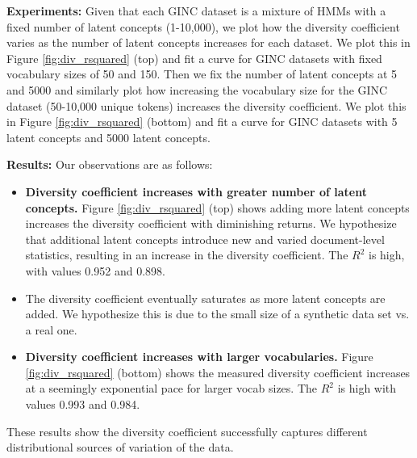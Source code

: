 \documentclass[10pt]{article} %
\begin{document}
\textbf{Experiments:}
Given that each GINC dataset is a mixture of HMMs with a fixed number of latent concepts (1-10,000), we plot how the diversity coefficient varies as the number of latent concepts increases for each dataset.
We plot this in Figure \ref{fig:div_rsquared} (top) and fit a curve for GINC datasets with fixed vocabulary sizes of 50 and 150.
Then we fix the number of latent concepts at 5 and 5000 and similarly plot how increasing the vocabulary size for the GINC dataset (50-10,000 unique tokens) increases the diversity coefficient.
We plot this in Figure \ref{fig:div_rsquared} (bottom) and fit a curve for GINC datasets with 5 latent concepts and 5000 latent concepts.

\textbf{Results:}
Our observations are as follows:
\begin{itemize}
    \item \textbf{Diversity coefficient increases with greater number of latent concepts.} 
    Figure \ref{fig:div_rsquared} (top) shows adding more latent concepts increases the diversity coefficient with diminishing returns.
    We hypothesize that additional latent concepts introduce new and varied document-level statistics, resulting in an increase in the diversity coefficient.
    The $R^2$ is high, with values 0.952 and 0.898.
    \item The diversity coefficient eventually saturates as more latent concepts are added. 
    We hypothesize this is due to the small size of a synthetic data set vs. a real one.
    \item \textbf{Diversity coefficient increases with larger vocabularies.}
    Figure \ref{fig:div_rsquared} (bottom) shows the measured diversity coefficient increases at a seemingly exponential pace for larger vocab sizes.
    The $R^2$ is high with values 0.993 and 0.984.
\end{itemize}
These results show the diversity coefficient successfully captures different distributional sources of variation of the data.
\end{document}
